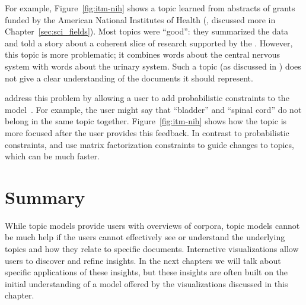 For example, Figure~\ref{fig:itm-nih} shows a topic learned from abstracts of
grants funded by the American National Institutes of Health
(, discussed more in Chapter~\ref{sec:sci_fields}).  Most
topics were ``good'': they summarized the data and told a story about
a coherent slice of research supported by the .  However,
this topic is more problematic; it combines words about the central
nervous system with words about the urinary system.  Such a topic (as
discussed in \citet{mimno-11}) does not give a clear understanding of the
documents it should represent.

\citet{hu-14:itm} address this problem by allowing a user to add probabilistic
constraints to the model~\citep{boyd-graber-07,andrzejewski-09}.  For example,
the user might say that ``bladder'' and ``spinal cord'' do not belong in the same
topic together.  Figure~\ref{fig:itm-nih} shows how the topic is more focused after the
user provides this feedback.  In contrast to probabilistic constraints,
\citet{choo-13} and \citet{lund-17} use matrix factorization constraints to guide changes
to topics, which can be much faster.

\section{Summary}

While topic models provide users with overviews of corpora, topic models
cannot be much help if the users cannot effectively see or understand
the underlying topics and how they relate to specific documents.
Interactive visualizations allow users to discover and
refine insights.  In the next chapters we will talk about specific applications of
these insights, but these insights are often built on the initial understanding
of a model offered by the visualizations discussed in this chapter.
